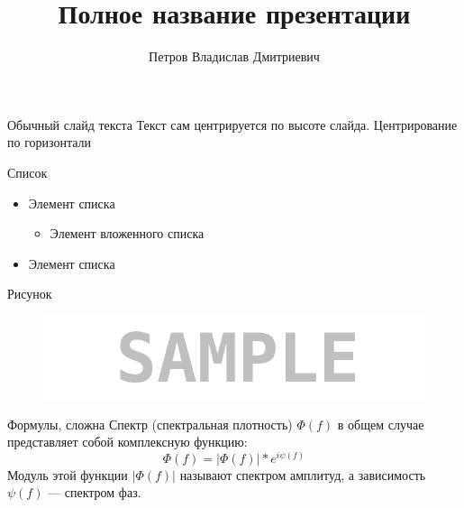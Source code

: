 \documentclass[11pt]{beamer}
\author[Петров В.Д.]{Петров Владислав Дмитриевич}
\title[Краткое название]{Полное название презентации}
\date{\the\year}
\begin{document}
\begin{frame}
\titlepage
\end{frame}


\begin{frame}{Обычный слайд текста}
Текст сам центрируется по высоте слайда. Центрирование по горизонтали 
\end{frame}


\begin{frame}{Список}
\begin{itemize}
	\item Элемент списка
	\begin{itemize}
		\item Элемент вложенного списка
	\end{itemize}
	\item Элемент списка
\end{itemize}
\end{frame}


\begin{frame}{Рисунок}
\begin{figure}[H]
	\includegraphics[scale=0.4]{pics/sample}
	\label{fig:sample}
\end{figure}
\end{frame}


\begin{frame}{Формулы, сложна}
Спектр (спектральная плотность) $\Phi(f)$ в общем случае представляет собой комплексную функцию: $$\Phi(f)=|\Phi(f)|*e^{i\psi(f)}$$
Модуль этой функции $|\Phi(f)|$ называют спектром амплитуд, а зависимость $\psi(f)$ — спектром фаз.
\end{frame}
\end{document}
